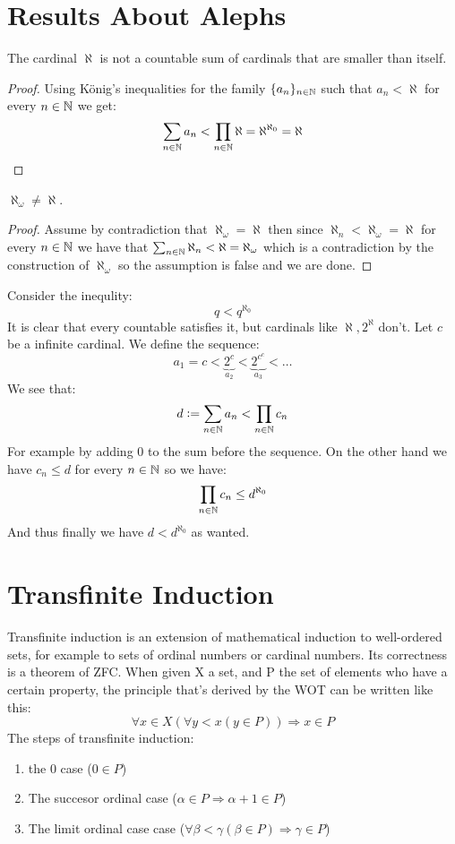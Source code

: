 \documentclass[11pt,a4paper]{article}
\begin{document}
	\section*{Results About Alephs}
	\begin{proposition}
		The cardinal $\aleph$ is not a countable sum of cardinals that are
		smaller than itself.
	\end{proposition}
	\begin{proof}
		Using König's inequalities for the family $\{a_n\}_{n \in \mathbb{N}}$ such
		that $a_n < \aleph$ for every $n \in \mathbb{N}$ we get:
		\[
			\sum_{n\in\mathbb{N}}{a_n} < \prod_{n\in\mathbb{N}}{\aleph} = \aleph^{\aleph_0}
			= \aleph
		\]
	\end{proof}
	\begin{corollary}
		$\aleph_\omega \neq \aleph$.
	\end{corollary}
	\begin{proof}
		Assume by contradiction that $\aleph_\omega = \aleph$ then since
		$\aleph_n < \aleph_\omega = \aleph $ for every $n \in \mathbb{N}$ we have 
		that $\sum_{n\in\mathbb{N}}{\aleph_n} < \aleph = \aleph_\omega$ which is
		a contradiction by the construction of $\aleph_\omega$ so the
		assumption is false and we are done.
	\end{proof}
	\noindent Consider the inequlity:
	\[
		q < q^{\aleph_0}
	\]
	It is clear that every countable satisfies it, but cardinals like
	$\aleph,2^\aleph$ don't. Let $c$ be a infinite cardinal. We define
	the sequence:
	\[
		a_1 = c < \underbrace{2^c}_{a_2} < \underbrace{2^{c^c}}_{a_3} < \dots
	\]
	We see that:
	\[
		d := \sum_{n \in \mathbb{N}}{a_n} < \prod_{n \in \mathbb{N}}{c_n}
	\]
	For example by adding $0$ to the sum before the sequence. On the other
	hand we have $c_n \le d$ for every $n \in \mathbb{N}$ so we have:
	\[
		\prod_{n \in \mathbb{N}}{c_n} \le d^{\aleph_0}
	\]
	And thus finally we have $d < d^{\aleph_0}$ as wanted.

\newpage
\section{Transfinite Induction}
Transfinite induction is an extension of mathematical induction to well-ordered
sets, for example to sets of ordinal numbers or cardinal numbers. Its 
correctness is a theorem of ZFC. When given X a set, and P the set of 
elements who have a certain property, the principle that’s derived by the 
WOT can be written like this:
\[
	\forall x\in X(\forall y<x(y\in P)) \Rightarrow x\in P
\]
The steps of transfinite induction:
\begin{enumerate}
\item the 0 case ($0\in P$)
\item The succesor ordinal case ($\alpha\in P \Rightarrow \alpha+1\in P$)
\item The limit ordinal case case ($\forall\beta<\gamma(\beta\in P)\Rightarrow 
\gamma\in P$)
\end{enumerate}
\end{document}
